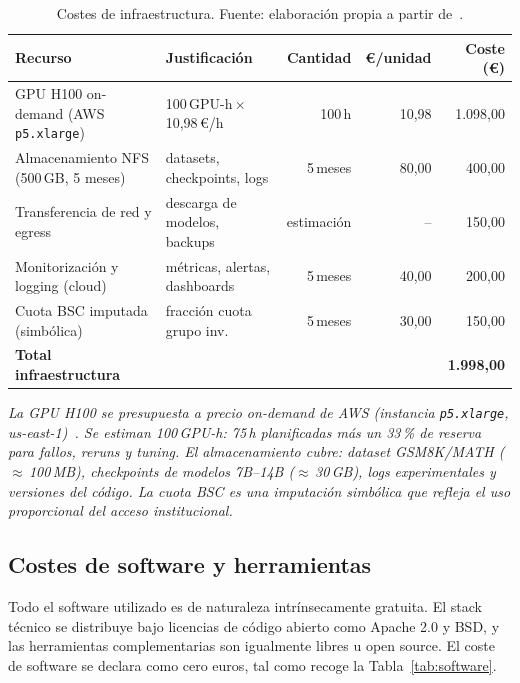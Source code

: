 \documentclass[11pt,a4paper]{article}
\begin{document}
\begin{table}[H]
\centering
\caption{Costes de infraestructura. Fuente: elaboración propia a partir de~\cite{lambda2026,aws2026}.}
\label{tab:infraestructura}
\footnotesize
\begin{tabular}{l l r r r}
\toprule
\textbf{Recurso} & \textbf{Justificación} & \textbf{Cantidad} & \textbf{\euro{}/unidad} & \textbf{Coste (\euro{})} \\
\midrule
GPU H100 on-demand (AWS \texttt{p5.xlarge})  & 100\,GPU-h\,×\,10,98\,\euro{}/h~\cite{aws2026} & 100\,h & 10,98 & 1.098,00 \\
Almacenamiento NFS (500\,GB, 5 meses)        & datasets, checkpoints, logs    & 5\,meses & 80,00 & 400,00 \\
Transferencia de red y egress                & descarga de modelos, backups   & estimación & -- & 150,00 \\
Monitorización y logging (cloud)             & métricas, alertas, dashboards  & 5\,meses & 40,00 & 200,00 \\
Cuota BSC imputada (simbólica)               & fracción cuota grupo inv.      & 5\,meses & 30,00 & 150,00 \\
\midrule
\textbf{Total infraestructura} & & & & \textbf{1.998,00} \\
\bottomrule
\end{tabular}
\end{table}

\noindent\textit{\scriptsize La GPU H100 se presupuesta a precio on-demand de AWS (instancia \texttt{p5.xlarge}, us-east-1)~\cite{aws2026}. Se estiman 100\,GPU-h: 75\,h planificadas más un 33\,\% de reserva para fallos, reruns y tuning. El almacenamiento cubre: dataset GSM8K/MATH ($\approx$\,100\,MB), checkpoints de modelos 7B--14B ($\approx$\,30\,GB), logs experimentales y versiones del código. La cuota BSC es una imputación simbólica que refleja el uso proporcional del acceso institucional.}

\subsection{Costes de software y herramientas}

Todo el software utilizado es de naturaleza intrínsecamente gratuita. El stack técnico se distribuye bajo licencias de código abierto como Apache 2.0 y BSD, y las herramientas complementarias son igualmente libres u open source. El coste de software se declara como cero euros, tal como recoge la Tabla~\ref{tab:software}.
\end{document}
